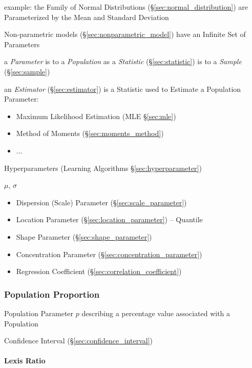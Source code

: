 example: the Family of Normal Distributions (\S\ref{sec:normal_distribution})
are Parameterized by the Mean and Standard Deviation

Non-parametric models (\S\ref{sec:nonparametric_model}) have an Infinite Set of
Parameters

a \emph{Parameter} is to a \emph{Population} as a \emph{Statistic}
(\S\ref{sec:statistic}) is to a \emph{Sample} (\S\ref{sec:sample})

\fist an \emph{Estimator} (\S\ref{sec:estimator}) is a Statistic used to
Estimate a Population Parameter:
\begin{itemize}
  \item Maximum Likelihood Estimation (MLE \S\ref{sec:mle})
  \item Method of Moments (\S\ref{sec:moments_method})
  \item ...
\end{itemize}

\fist Hyperparameters (Learning Algorithms \S\ref{sec:hyperparameter})

$\mu$, $\sigma$

\begin{itemize}
  \item Dispersion (Scale) Parameter (\S\ref{sec:scale_parameter})
  \item Location Parameter (\S\ref{sec:location_parameter}) -- Quantile
  \item Shape Parameter (\S\ref{sec:shape_parameter})
  \item Concentration Parameter (\S\ref{sec:concentration_parameter})
  \item Regression Coefficient (\S\ref{sec:correlation_coefficient})
\end{itemize}



\subsubsection{Population Proportion}\label{sec:proportion}

Population Parameter $p$ describing a percentage value associated with a
Population

\fist Confidence Interval (\S\ref{sec:confidence_interval})



\paragraph{Lexis Ratio}\label{sec:lexis_ratio}\hfill



